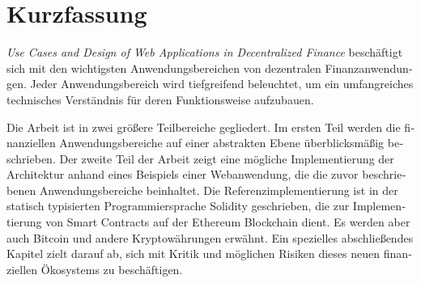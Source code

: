 \chapter{Kurzfassung}

\begin{german}
\textit{Use Cases and Design of Web Applications in Decentralized Finance} beschäftigt sich mit den wichtigsten Anwendungsbereichen von dezentralen
Finanzanwendungen. Jeder Anwendungsbereich wird tiefgreifend beleuchtet, um ein umfangreiches technisches Verständnis für deren Funktionsweise
aufzubauen.

Die Arbeit ist in zwei größere Teilbereiche gegliedert. Im ersten Teil werden die finanziellen Anwendungsbereiche auf einer abstrakten Ebene
überblicksmäßig beschrieben. Der zweite Teil der Arbeit zeigt eine mögliche Implementierung der Architektur anhand eines Beispiels einer Webanwendung,
die die zuvor beschriebenen Anwendungsbereiche beinhaltet. Die Referenzimplementierung ist in der statisch typisierten Programmiersprache Solidity
geschrieben, die zur Implementierung von Smart Contracts auf der Ethereum Blockchain dient. Es werden aber auch Bitcoin und andere
Kryptowährungen erwähnt. Ein spezielles abschließendes Kapitel zielt darauf ab, sich mit Kritik und möglichen Risiken dieses neuen finanziellen
Ökosystems zu beschäftigen.
\end{german}